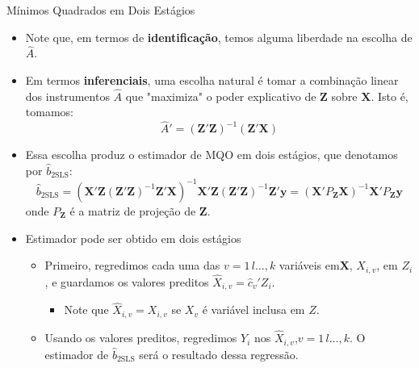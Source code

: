 \documentclass[11pt]{beamer}
\begin{document}
\begin{frame}{Mínimos Quadrados em Dois Estágios}
\begin{itemize}
	\item Note que, em termos de \textbf{identificação}, temos alguma liberdade na escolha de $\hat{A}$.
	\item Em termos \textbf{inferenciais}, uma escolha natural é tomar a combinação linear dos instrumentos $\hat{A}$ que "maximiza" o poder explicativo de $\boldsymbol{Z}$ sobre $\boldsymbol{X}$. Isto é, tomamos:
	$$\hat{A}' = (\boldsymbol{Z}'\boldsymbol{Z})^{-1}(\boldsymbol{Z}'\boldsymbol{X}) $$
	\item Essa escolha produz o estimador de {\color{blue}MQO em dois estágios}, que denotamos por $\hat{b}_{\text{2SLS}}$:
	\begin{equation*}
		\hat{b}_{\text{2SLS}} = (\boldsymbol{X}'\boldsymbol{Z}(\boldsymbol{Z}'\boldsymbol{Z})^{-1}\boldsymbol{Z}'\boldsymbol{X})^{-1} \boldsymbol{X}'\boldsymbol{Z}(\boldsymbol{Z}'\boldsymbol{Z})^{-1} \boldsymbol{Z}'\boldsymbol{y} = \left(\boldsymbol{X}'P_{\boldsymbol{Z}}\boldsymbol{X}\right)^{-1}\boldsymbol{X}'P_{\boldsymbol{Z}}\boldsymbol{y} 
	\end{equation*}
	onde $P_{\boldsymbol{Z}}$ é a matriz de projeção de $\boldsymbol{Z}$.
	\item Estimador pode ser obtido em dois estágios
	\begin{itemize}
		\item Primeiro, regredimos cada uma das $v=1\,l\dots,k$ variáveis em$\boldsymbol{X}$, $X_{i,v}$, em $Z_i$, e guardamos os valores preditos $\hat{X}_{i,v} = \hat{c}_{v}'Z_i$.
		\begin{itemize}
			\item Note que $\hat{X}_{i,v} = X_{i,v} $ se $X_{v}$ é variável inclusa em $Z$. 
		\end{itemize}
		\item Usando os valores preditos, regredimos $Y_i$ nos $\hat{X}_{i,v}$,$v=1\,l\dots,k$.  O estimador de $\hat{b}_{\text{2SLS}}$ será o resultado dessa regressão.
	\end{itemize}
\end{itemize}
\end{frame}
\end{document}
